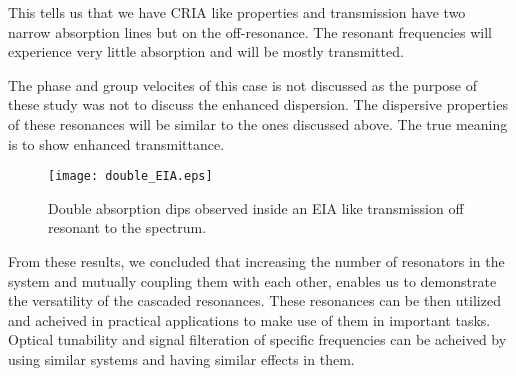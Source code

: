 This tells us that we have CRIA like properties and transmission have two narrow absorption lines but on the off-resonance. The resonant frequencies will experience very little absorption and will be mostly transmitted. 

The phase and group velocites of this case is not discussed as the purpose of these study was not to discuss the enhanced dispersion. The dispersive properties of these resonances will be similar to the ones discussed above. The true meaning is to show enhanced transmittance.

\begin{figure}[h]
\centering
\texttt{[image: double\_EIA.eps]}
\caption{Double absorption dips observed inside an EIA like transmission off resonant to the spectrum.}
\end{figure}

From these results, we concluded that increasing the number of resonators in the system and mutually coupling them with each other, enables us to demonstrate the versatility of the cascaded resonances. These resonances can be then utilized and acheived in practical applications to make use of them in important tasks. Optical tunability and signal filteration of specific frequencies can be acheived by using similar systems and having similar effects in them.
\newpage
